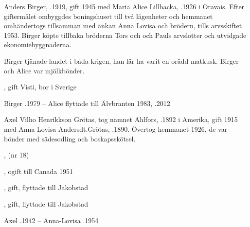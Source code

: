 Anders Birger, .1919, gift 1945 med Maria Alice Lillbacka, .1926 i Oravais. Efter giftermålet ombyggdes boningshuset till två lägenheter och hemmanet omhändertogs tillsamman med änkan Anna Lovisa och brödern, tills arvsskiftet 1953. Birger köpte tillbaka bröderna Tors och och Pauls arvslotter och utvidgade ekonomiebyggnaderna.

Birger tjänade landet i båda krigen, han lär ha varit en orädd matkusk. Birger och Alice var mjölkbönder.
\begin{jhchildren}
  \item {}, gift Visti, bor i Sverige
  \item {}
\end{jhchildren}
Birger .1979  --  Alice flyttade till Älvbranten 1983, .2012


Axel Vilho Henrikkson Grötas, tog namnet Ahlfors, .1892 i Amerika, gift 1915 med Anna-Lovisa Andersdt.Grötas, .1890. Övertog hemmanet 1926, de var bönder med sädesodling och boskapsskötsel.
\begin{jhchildren}
  \item {}
  \item {}, (nr 18)
  \item {}, ogift till Canada 1951
  \item {}, gift, flyttade till Jakobstad
  \item {}, gift, flyttade till Jakobstad
\end{jhchildren}
Axel .1942  --  Anna-Lovisa .1954


